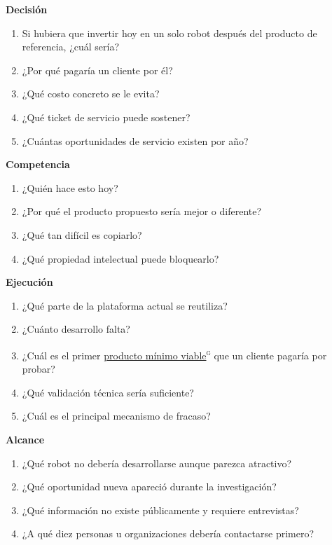\documentclass[11pt,a4paper]{article}
\newenvironment{tarjeta}[2]
  {\begin{tarjetabase}%
   {\sffamily\bfseries\color{navy}#1}%
   \ifstrempty{#2}{}{\\[1pt]{\sffamily\scriptsize\color{gray2}#2}}%
   \par\vspace{3pt}}
  {\end{tarjetabase}}
\begin{document}
\begin{tarjeta}{Decisión}{}
\begin{enumerate}
\item Si hubiera que invertir hoy en un solo robot después del producto de referencia, ¿cuál sería?
\item ¿Por qué pagaría un cliente por él?
\item ¿Qué costo concreto se le evita?
\item ¿Qué ticket de servicio puede sostener?
\item ¿Cuántas oportunidades de servicio existen por año?
\end{enumerate}

\end{tarjeta}
\begin{tarjeta}{Competencia}{}
\begin{enumerate}[start=6]
\item ¿Quién hace esto hoy?
\item ¿Por qué el producto propuesto sería mejor o diferente?
\item ¿Qué tan difícil es copiarlo?
\item ¿Qué propiedad intelectual puede bloquearlo?
\end{enumerate}

\end{tarjeta}
\begin{tarjeta}{Ejecución}{}
\begin{enumerate}[start=10]
\item ¿Qué parte de la plataforma actual se reutiliza?
\item ¿Cuánto desarrollo falta?
\item ¿Cuál es el primer \hyperlink{g-mvp}{producto mínimo viable}\textsuperscript{\textsc{g}} que un cliente pagaría por probar?
\item ¿Qué validación técnica sería suficiente?
\item ¿Cuál es el principal mecanismo de fracaso?
\end{enumerate}

\end{tarjeta}
\begin{tarjeta}{Alcance}{}
\begin{enumerate}[start=15]
\item ¿Qué robot no debería desarrollarse aunque parezca atractivo?
\item ¿Qué oportunidad nueva apareció durante la investigación?
\item ¿Qué información no existe públicamente y requiere entrevistas?
\item ¿A qué diez personas u organizaciones debería contactarse primero?
\end{enumerate}

\end{tarjeta}
\end{document}
